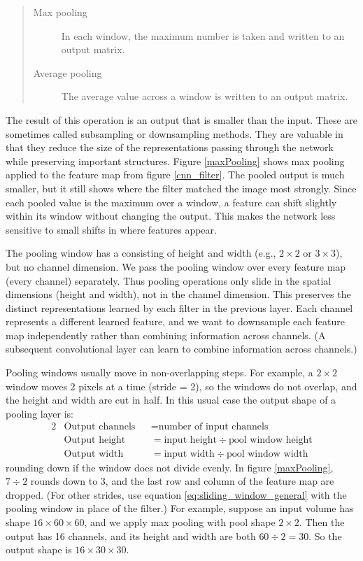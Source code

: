 \begin{quote}
\begin{description}
\item[Max pooling] In each window, the maximum number is taken and written to an output matrix.
\item[Average pooling] The average value across a window is written to an output matrix.
\end{description}
\end{quote}
The result of this operation is an output that is smaller than the input. These are sometimes called subsampling or downsampling methods. They are valuable in that they reduce the size of the representations passing through the network while preserving important structures. Figure \ref{maxPooling} shows max pooling applied to the feature map from figure \ref{cnn_filter}. The pooled output is much smaller, but it still shows where the filter matched the image most strongly. Since each pooled value is the maximum over a window, a feature can shift slightly within its window without changing the output. This makes the network less sensitive to small shifts in where features appear.

The pooling window has a  consisting of height and width (e.g., $2 \times 2$ or $3 \times 3$), but no channel dimension. We pass the pooling window over every feature map (every channel) separately. Thus pooling operations only slide in the spatial dimensions (height and width), not in the channel dimension. This preserves the distinct representations learned by each filter in the previous layer. Each channel represents a different learned feature, and we want to downsample each feature map independently rather than combining information across channels. (A subsequent convolutional layer can learn to combine information across channels.)

Pooling windows usually move in non-overlapping steps. For example, a $2 \times 2$ window moves 2 pixels at a time (stride = 2), so the windows do not overlap, and the height and width are cut in half. In this usual case the output shape of a pooling layer is:
\begin{alignat*}{2}
&\text{Output channels} &&= \text{number of input channels}\\
&\text{Output height} &&= \text{input height} \div \text{pool window height}\\
&\text{Output width} &&= \text{input width} \div \text{pool window width}
\end{alignat*}
rounding down if the window does not divide evenly. In figure \ref{maxPooling}, $7 \div 2$ rounds down to 3, and the last row and column of the feature map are dropped. (For other strides, use equation \ref{eq:sliding_window_general} with the pooling window in place of the filter.) For example, suppose an input volume has shape $16 \times 60 \times 60$, and we apply max pooling with pool shape $2 \times 2$. Then the output has 16 channels, and its height and width are both $60 \div 2 = 30$. So the output shape is $16 \times 30 \times 30$.


